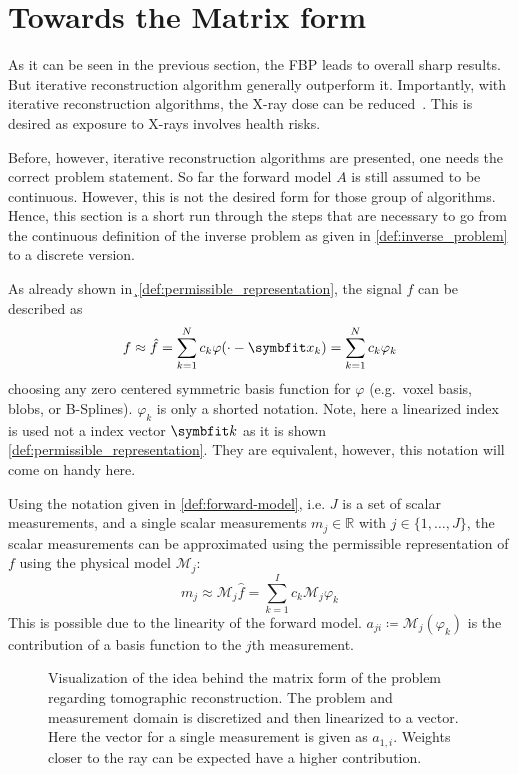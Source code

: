 \section{Towards the Matrix form}\label{sec:matrix_formulation}

As it can be seen in the previous section, the \gls{FBP} leads to overall sharp results. But
iterative reconstruction algorithm generally outperform it. Importantly, with iterative
reconstruction algorithms, the X-ray dose can be reduced~\cite{willemink_evolution_2019}. This is
desired as exposure to X-rays involves health risks.

Before, however, iterative reconstruction algorithms are presented, one needs the correct problem
statement. So far the forward model \(A\) is still assumed to be continuous. However, this is not
the desired form for those group of algorithms. Hence, this section is a short run through the steps
that are necessary to go from the continuous definition of the inverse problem as given in
\autoref{def:inverse_problem} to a discrete version.

As already shown in¸\autoref{def:permissible_representation}, the signal \(f\) can be described as
\begin{equation}
	f \approx \near{f} = \sum_{k=1}^{N} c_k \varphi(\cdot - \mvec{x}_k) = \sum_{k=1}^{N} c_k \varphi_k
\end{equation}
choosing any zero centered symmetric basis function for \(\varphi\) (e.g.\ voxel basis, blobs, or
B-Splines). \(\varphi_k\) is only a shorted notation. Note, here a linearized index is used not a
index vector \(\mvec{k}\) as it is shown \autoref{def:permissible_representation}. They are
equivalent, however, this notation will come on handy here.

Using the notation given in \autoref{def:forward-model}, i.e. \(J\) is a set of scalar measurements,
and a single scalar measurements \(m_j \in \mathbb{R}\) with \(j \in \lbrace 1, \dots, J \rbrace\),
the scalar measurements can be approximated using the permissible representation of \(f\) using the
physical model \(\mathscr{M}_j\):
\begin{equation}
	m_j \approx \mathscr{M}_j\hat{f} = \sum_{k=1}^{I} c_k \mathscr{M}_j\varphi_k
\end{equation}
This is possible due to the linearity of the forward model. \(a_{ji} \coloneq
\mathscr{M}_j(\varphi_k)\) is the contribution of a basis function to the \(j\)th measurement.

\begin{figure}
	\centering
	\resizebox{0.7\textwidth}{!}{%
		
	}%
	\caption{Visualization of the idea behind the matrix form of the problem regarding
		tomographic reconstruction. The problem and measurement domain is discretized and
		then linearized to a vector. Here the vector for a single measurement is given as
		\(a_{1,i}\). Weights closer to the ray can be expected have a higher
		contribution.}\label{fig:matrix_row}
\end{figure}


